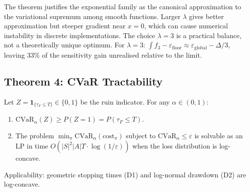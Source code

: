 \begin{remark}
\label{rem:arxiv-thm3-practical}
The theorem justifies the exponential family as the canonical
approximation to the variational supremum among smooth functions.
Larger $\lambda$ gives better approximation but steeper gradient
near $x = 0$, which can cause numerical instability in discrete
implementations. The choice $\lambda = 3$ is a practical balance,
not a theoretically unique optimum. For $\lambda = 3$:
$\int f_3 - \varepsilon_{\mathrm{floor}} \approx
\varepsilon_{\mathrm{global}} - \Delta / 3$, leaving 33\% of the
sensitivity gain unrealised relative to the limit.
\end{remark}

\subsection{Theorem 4: CVaR Tractability}
\label{sec:arxiv-thm-4}

\begin{theorem}
\label{thm:arxiv-cvar}
Let $Z = \mathbf{1}_{\{\tau_F \le T\}} \in \{0, 1\}$ be the ruin
indicator. For any $\alpha \in (0, 1)$:

\begin{enumerate}
\item[(i)] $\mathrm{CVaR}_\alpha(Z) \ge P(Z = 1) =
P(\tau_F \le T)$.

\item[(ii)] The problem
$\min_\pi \mathrm{CVaR}_\alpha(\mathrm{cost}_\pi)$ subject to
$\mathrm{CVaR}_\alpha \le \varepsilon$ is solvable as an LP in time
$O(|S|^2 |A| T \cdot \log(1 / \varepsilon))$ when the loss
distribution is log-concave.
\end{enumerate}

Applicability: geometric stopping times (D1) and log-normal drawdown
(D2) are log-concave.
\end{theorem}

